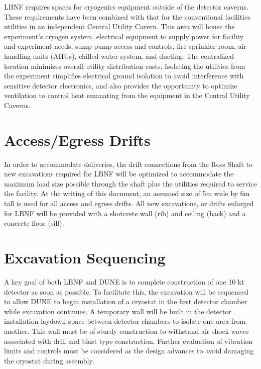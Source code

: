 LBNF requires spaces for cryogenics equipment outside of the detector caverns. These requirements have been combined with that for the conventional facilities utilities in an independent Central Utility Cavern. This area will house the experiment's cryogen system, electrical equipment to supply power for facility and experiment needs, sump pump access and controls, fire sprinkler room, air handling units (AHUs), chilled water system, and ducting. The centralized location minimizes overall utility distribution costs. Isolating the utilities from the experiment simplifies electrical ground isolation to avoid interference with sensitive detector electronics, and also provides the opportunity to optimize ventilation to control heat emanating from the equipment in the Central Utility Caverns.

\section{Access/Egress Drifts}
\label{sec:fscf-excav-access-drifts}

In order to accommodate deliveries, the drift connections from the Ross Shaft to new excavations required for LBNF will be optimized to accommodate the maximum load size possible through the shaft plus the utilities required to service the facility. At the writing of this document, an assumed size of 5m wide by 6m tall is used for all access and egress drifts. All new excavations, or drifts enlarged for LBNF will be provided with a shotcrete wall (rib) and ceiling (back) and a concrete floor (sill).

\section{Excavation Sequencing}
\label{sec:fscf-excav-exc-seq}

A key goal of both LBNF and DUNE is to complete construction of one 10 kt detector as soon as possible. To facilitate this, the excavation will be sequenced to allow DUNE to begin installation of a cryostat in the first detector chamber while excavation continues. A temporary wall will be built in the detector installation laydown space between detector chambers to isolate one area from another. This wall must be of sturdy construction to withstand air shock waves associated with drill and blast type construction. Further evaluation of vibration limits and controls must be considered as the design advances to avoid damaging the cryostat during assembly.

